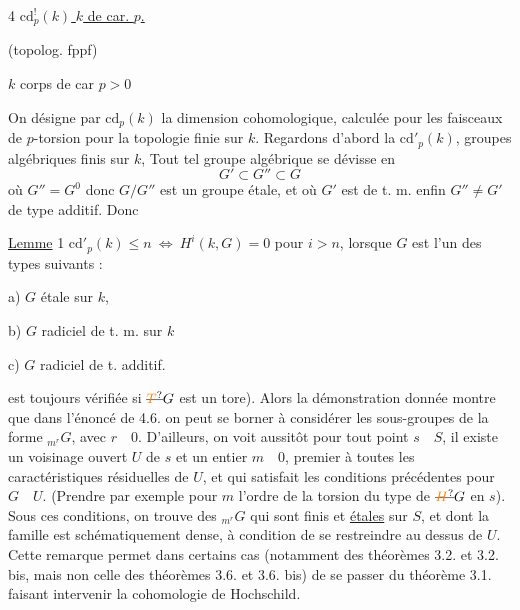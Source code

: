 4
\uline{$\mathrm{cd}^{!}_{p}(k)$  $k$ de car. $p$.}

(topolog. fppf)


$k$ corps de car $p>0$

On désigne par $\mathrm{cd}_{p}(k)$ la dimension cohomologique, calculée pour les faisceaux de $p$-torsion pour la topologie finie   sur $k$. Regardons d'abord la $\mathrm{cd}'_{p}(k)$,  groupes algébriques  finis sur $k$,  Tout tel groupe algébrique se dévisse en
\[
G'\subset G''\subset G
\]
où $G''=G^{0}$ donc $G/G''$ est un groupe étale, et où $G'$ est  de t. m. enfin $G''\neq G'$  de type additif. Donc

\uline{Lemme} 1 \quad $\mathrm{cd}'_{p}(k)\leq n\ \Longleftrightarrow\ H^{i}(k,G)=0$ pour $i>n$, lorsque $G$ est  l'un des types suivants :

a) $G$ étale sur $k$, 

b) $G$ radiciel de t. m. sur $k$

c) $G$  radiciel de t. additif.


est toujours vérifiée si $\deleted{\unsure{T}}G$ est un tore). Alors la démonstration donnée montre que dans l'énoncé de 4.6.  on peut se borner à considérer les sous-groupes de la forme $ {}_{m^{r}}\!G$, avec $r\quad 0$. D'ailleurs, on voit aussitôt   pour tout point $s\quad S$, il existe un voisinage ouvert $U$ de $s$  et un entier $m\quad 0$, premier à toutes les caractéristiques  résiduelles de $U$, et qui satisfait les conditions précédentes pour $G\quad U$. (Prendre par exemple pour $m$ l'ordre de la torsion du type de $\deleted{\unsure{H}}G$  en $s$). Sous ces conditions, on trouve des $ {}_{m^{r}}\!G$ qui sont finis et \uline{étales} sur $S$, et dont la famille est schématiquement dense, à condition de se restreindre au dessus de $U$. Cette remarque permet dans certains cas (notamment   des théorèmes 3.2. et 3.2. bis,   mais non celle des théorèmes 3.6. et 3.6. bis) de se passer du théorème 3.1. faisant intervenir la cohomologie de Hochschild. 

